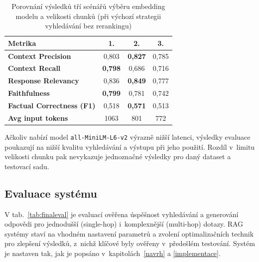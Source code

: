 \begin{table}[H]
    \centering
    \renewcommand{\arraystretch}{1.2}
    \begin{tabular}{|l|c|c|c|}
        \hline
        \textbf{Metrika} & \textbf{1.} & \textbf{2.} & \textbf{3.} \\
        \hline
        \textbf{Context Precision}         & 0{,}803 & \textbf{0{,}827} & 0{,}785 \\
        \textbf{Context Recall}            & \textbf{0{,}798} & 0{,}686 & 0{,}716 \\
        \textbf{Response Relevancy}        & 0{,}836 & \textbf{0{,}849} & 0{,}777 \\
        \textbf{Faithfulness}              & \textbf{0{,}799} & 0{,}781 & 0{,}742 \\
        \textbf{Factual Correctness (F1)}  & 0{,}518 & \textbf{0{,}571} & 0{,}513 \\
        \textbf{Avg input tokens}          & 1063 & 801 & 772 \\
        \hline
    \end{tabular}
    \caption{Porovnání výsledků tří scénářů výběru embedding modelu a velikosti chunků (při výchozí strategii vyhledávání bez rerankingu)}
    \label{tab:embedchunk}
\end{table}
Ačkoliv nabízí model \texttt{all-MiniLM-L6-v2} výrazně nižší latenci, výsledky evaluace poukazují na nižší kvalitu vyhledávání a výstupu při jeho použití. Rozdíl v~limitu velikosti chunku pak nevykazuje jednoznačné výsledky pro daný dataset a testovací sadu.

\subsection{Evaluace systému}
V tab.~\ref{tab:finaleval} je evaluací ověřena úspěšnost vyhledávání a generování odpovědi pro jednodušší (single-hop) i~komplexnější (multi-hop) dotazy. RAG systémy staví na vhodném nastavení parametrů a zvolení optimalizačních technik pro zlepšení výsledků, z~nichž klíčové byly ověřeny v~předešlém testování. Systém je nastaven tak, jak je popsáno v~kapitolách~\ref{navrh} a \ref{implementace}.


